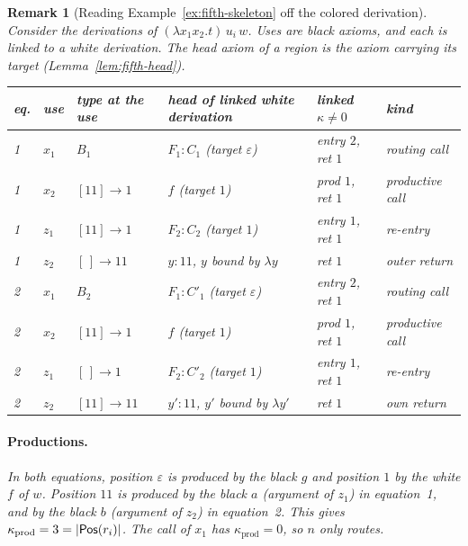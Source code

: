 \documentclass[10pt,a4paper]{article}
\theoremstyle{plain}%
\newtheorem{remark}[theorem]{Remark}
\begin{document}
\begin{remark}[Reading Example~\ref{ex:fifth-skeleton} off the colored derivation]
Consider the derivations of $(\lambda x_1x_2.t)\,u_i\,w$.
Uses are black axioms, and each is linked to a white derivation.
The head axiom of a region is the axiom carrying its target (Lemma~\ref{lem:fifth-head}).
\begin{center}
\begin{tabular}{llllll}
eq. & use & type at the use & head of linked white derivation & linked $\kappa \neq 0$ & kind\\ \hline
1 & $x_1$ & $B_1$ & $F_1 : C_1$ (target $\varepsilon$) & entry $2$, ret $1$ & routing call\\
1 & $x_2$ & $[11] \to 1$ & $f$ (target $1$) & prod $1$, ret $1$ & productive call\\
1 & $z_1$ & $[11] \to 1$ & $F_2 : C_2$ (target $1$) & entry $1$, ret $1$ & re-entry\\
1 & $z_2$ & $[\,] \to 11$ & $y : 11$, $y$ bound by $\lambda y$ & ret $1$ & outer return\\ \hline
2 & $x_1$ & $B_2$ & $F_1 : C'_1$ (target $\varepsilon$) & entry $2$, ret $1$ & routing call\\
2 & $x_2$ & $[11] \to 1$ & $f$ (target $1$) & prod $1$, ret $1$ & productive call\\
2 & $z_1$ & $[\,] \to 1$ & $F_2 : C'_2$ (target $1$) & entry $1$, ret $1$ & re-entry\\
2 & $z_2$ & $[11] \to 11$ & $y' : 11$, $y'$ bound by $\lambda y'$ & ret $1$ & own return
\end{tabular}
\end{center}

\paragraph{Productions.}
In both equations, position $\varepsilon$ is produced by the black $g$ and position $1$ by the white $f$ of $w$.
Position $11$ is produced by the black $a$ (argument of $z_1$) in equation~1, and by the black $b$ (argument of $z_2$) in equation~2.
This gives $\kappa_{\mathrm{prod}} = 3 = |\mathsf{Pos}(r_i)|$.
The call of $x_1$ has $\kappa_{\mathrm{prod}} = 0$, so $n$ only routes.


\end{remark}
\end{document}
